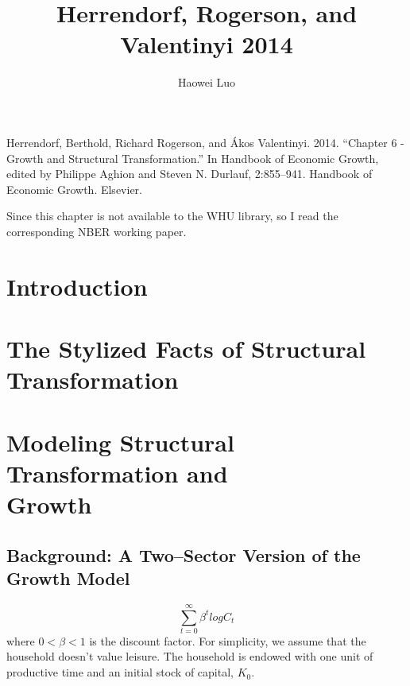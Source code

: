 \documentclass{article}
\title{Herrendorf, Rogerson, and Valentinyi 2014}
\author{Haowei Luo}
\begin{document}
    \maketitle
    Herrendorf, Berthold, Richard Rogerson, and Ákos Valentinyi. 2014. “Chapter 6 - Growth and Structural Transformation.” In Handbook of Economic Growth, edited by Philippe Aghion and Steven N. Durlauf, 2:855–941. Handbook of Economic Growth. Elsevier. 

    Since this chapter is not available to the WHU library, so I read the corresponding NBER working paper.
    
    \section{Introduction}
    \section{The Stylized Facts of Structural Transformation}
    \section{Modeling Structural Transformation and \\Growth}
    \subsection{Background: A Two–Sector Version of the Growth Model}
    \begin{equation}
        \sum_{t=0}^\infty \beta^t log C_t
    \end{equation}
    where $0 < \beta < 1$ is the discount factor. For simplicity, we assume that the household doesn't value leisure. The household is endowed with one unit of productive time and an initial stock of capital, $K_0$.
    
\end{document}

